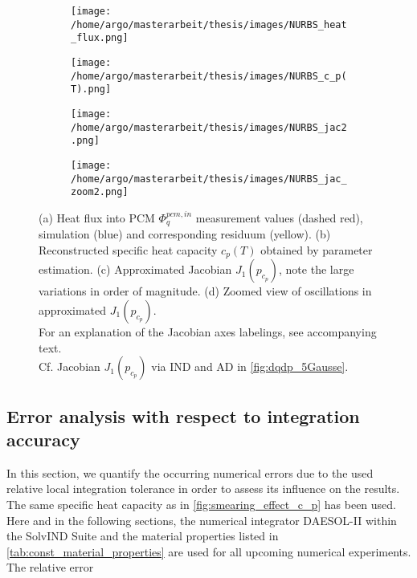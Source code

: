 \documentclass{scrartcl}[12pt, halfparskip]
\numberwithin{equation}{section}
\numberwithin{figure}{section}
\numberwithin{table}{section}
\begin{document}
\begin{figure}[H]
	\begin{subfigure}{0.49\textwidth}
		\texttt{[image: /home/argo/masterarbeit/thesis/images/NURBS\_heat\_flux.png]}
		\caption{}
	\end{subfigure}
	\begin{subfigure}{0.49\textwidth}
		\texttt{[image: /home/argo/masterarbeit/thesis/images/NURBS\_c\_p(T).png]}
		\caption{}
	\end{subfigure}
	\begin{subfigure}{0.49\textwidth}
		\hspace{0.1cm}
		\texttt{[image: /home/argo/masterarbeit/thesis/images/NURBS\_jac2.png]}
		\caption{}
		\label{fig:NURBS_results_jac2}
	\end{subfigure}
	\begin{subfigure}{0.49\textwidth}
		\hspace{0.4cm}
		\texttt{[image: /home/argo/masterarbeit/thesis/images/NURBS\_jac\_zoom2.png]}
		\caption{}
		\label{fig:NURBS_results_jac2_zoom}
	\end{subfigure}
	\caption{(a) Heat flux into PCM $\varPhi_q^{pcm,in}$ measurement values (dashed red), simulation (blue) and corresponding residuum (yellow). (b) Reconstructed specific heat capacity $c_p(T)$ obtained by parameter estimation. (c) Approximated Jacobian $J_1(p_{c_p})$, note the large variations in order of magnitude. (d) Zoomed view of oscillations in approximated $J_1(p_{c_p})$. \\
	For an explanation of the Jacobian axes labelings, see accompanying text. \\
	Cf. Jacobian $J_1(p_{c_p})$ via IND and AD in \cref{fig:dqdp_5Gausse}.}
	\label{fig:NURBS_results}
\end{figure}




\subsection{Error analysis with respect to integration accuracy}
In this section, we quantify the occurring numerical errors due to the used relative local integration tolerance in order to assess its influence on the results. The same specific heat capacity as in \cref{fig:smearing_effect_c_p} has been used. \\
Here and in the following sections, the numerical integrator DAESOL-II within the SolvIND Suite and the material properties listed in \cref{tab:const_material_properties} are used for all upcoming numerical experiments. \\
The relative error
\end{document}
